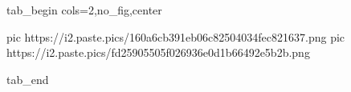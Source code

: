  
 
 
 
 

\ifcmt
  tab_begin cols=2,no_fig,center

		 pic https://i2.paste.pics/160a6cb391eb06c82504034fec821637.png
		 pic https://i2.paste.pics/fd25905505f026936e0d1b66492e5b2b.png

  tab_end
\fi
